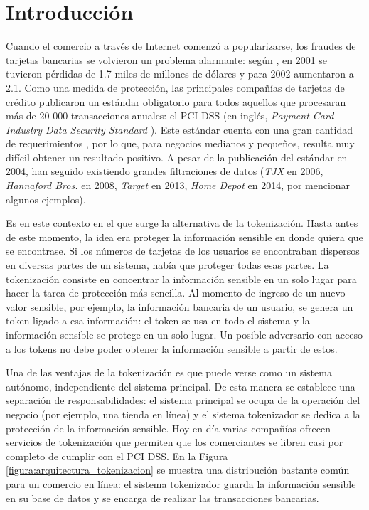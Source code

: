 %
%

\section{Introducción}


Cuando el comercio a través de Internet comenzó a popularizarse, los fraudes de
tarjetas bancarias se volvieron un problema alarmante: según \cite{wallethub},
en 2001 se tuvieron pérdidas de 1.7 miles de millones de dólares y para 2002
aumentaron a 2.1. Como una medida de protección, las principales compañías de
tarjetas de crédito publicaron un estándar obligatorio para todos aquellos que
procesaran más de 20 000 transacciones anuales: el PCI DSS (en inglés,
\textit{Payment Card Industry Data Security Standard} \cite{pci_dss}). Este
estándar cuenta con una gran cantidad de requerimientos \cite{search_security,
uk_association}, por lo que, para negocios medianos y pequeños, resulta
muy difícil obtener un resultado positivo. A pesar de la publicación del
estándar en 2004, han seguido existiendo grandes filtraciones de datos
(\textit{TJX} en 2006, \textit{Hannaford Bros.} en 2008, \textit{Target} en
2013, \textit{Home Depot} en 2014, por mencionar algunos ejemplos).


Es en este contexto en el que surge la alternativa de la tokenización. Hasta
antes de este momento, la idea era proteger la información sensible en donde
quiera que se encontrase. Si los números de tarjetas de los usuarios se
encontraban dispersos en diversas partes de un sistema, había que proteger todas
esas partes. La tokenización consiste en concentrar la información sensible en
un solo lugar para hacer la tarea de protección más sencilla. Al momento de
ingreso de un nuevo valor sensible, por ejemplo, la información bancaria de un
usuario, se genera un token ligado a esa información: el token se usa en todo el
sistema y la información sensible se protege en un solo lugar. Un posible
adversario con acceso a los tokens no debe poder obtener la información sensible
a partir de estos.

Una de las ventajas de la tokenización es que puede verse como un sistema
autónomo, independiente del sistema principal. De esta manera se establece una
separación de responsabilidades: el sistema principal se ocupa de la operación
del negocio (por ejemplo, una tienda en línea) y el sistema tokenizador se
dedica a la protección de la información sensible. Hoy en día varias compañías
ofrecen servicios de tokenización que permiten que los comerciantes se libren
casi por completo de cumplir con el PCI DSS. En la Figura
\ref{figura:arquitectura_tokenizacion} se muestra una distribución bastante
común para un comercio en línea: el sistema tokenizador guarda la información
sensible en su base de datos y se encarga de realizar las transacciones
bancarias.

